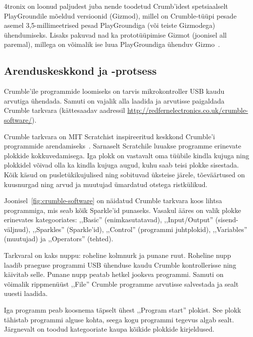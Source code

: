 \documentclass[12pt]{article}
\begin{document}
4tronix on loonud paljudest juba nende toodetud Crumb’idest spetsiaalselt PlayGroundile mõeldud versioonid (Gizmod), millel on Crumble-tüüpi pesade asemel 3,5-millimeetrised pesad PlayGroundiga (või teiste Gizmodega) ühendumiseks. Lisaks pakuvad nad ka prototüüpimise Gizmot (joonisel all paremal), millega on võimalik ise luua PlayGroundiga ühenduv Gizmo~\cite{PrototypingGizmoforPlayground-MakeyourownGizmo}.


\subsection{Arenduskeskkond ja -protsess} \label{tarkvara}

Crumble’ile programmide loomiseks on tarvis mikrokontroller USB kaudu arvutiga ühendada. Samuti on vajalik alla laadida ja arvutisse paigaldada Crumble tarkvara (kättesaadav aadressil \url{http://redfernelectronics.co.uk/crumble-software/}).

Crumble tarkvara on MIT Scratchist inspireeritud keskkond Crumble’i programmide arendamiseks~\cite{TheCrumbleController}. Sarnaselt Scratchile luuakse programme erinevate plokkide kokkuvedamisega. Iga plokk on vastavalt oma tüübile kindla kujuga ning plokkidel võivad olla ka kindla kujuga augud, kuhu saab teisi plokke sisestada. Kõik käsud on pusletükikujulised ning sobituvad üksteise järele, tõeväärtused on kuusnurgad ning arvud ja muutujad ümardatud otstega ristkülikud.


Joonisel~\ref{fig:crumble-software} on näidatud Crumble tarkvara koos lihtsa programmiga, mis seab kõik Sparkle’id punaseks. Vasakul ääres on valik plokke erinevates kategooriates: ,,Basic'' (enimkasutatavad), ,,Input/Output'' (sisend-väljnud), ,,Sparkles'' (Sparkle’id), ,,Control'' (programmi juhtplokid), ,,Variables'' (muutujad) ja ,,Operators'' (tehted).

Tarkvaral on kaks nuppu: roheline kolmnurk ja punane ruut. Roheline nupp laadib praeguse programmi USB ühenduse kaudu Crumble kontrollerisse ning käivitab selle. Punane nupp peatab hetkel jooksva programmi. Samuti on võimalik rippmenüüst ,,File'' Crumble programme arvutisse salvestada ja sealt uuesti laadida.

Iga programm peab koosnema täpselt ühest ,,Program start'' plokist. See plokk tähistab programmi alguse kohta, seega kogu programmi tegevus algab sealt. Järgnevalt on toodud kategooriate kaupa kõikide plokkide kirjeldused.
\end{document}
